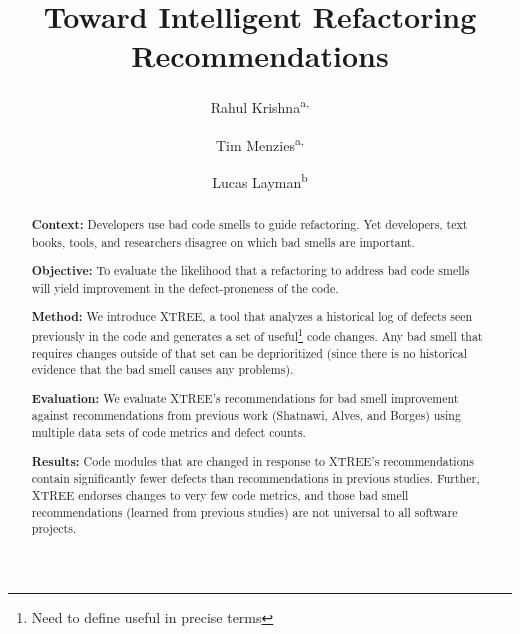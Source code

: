 \documentclass[twocolumn,5p]{elsarticle}
\theoremstyle{break}
\begin{document}
	
	\begin{frontmatter}
		
		\title{Toward Intelligent Refactoring Recommendations}
		
		\author{Rahul Krishna\textsuperscript{a,}}
		\author{Tim Menzies\textsuperscript{a,}}
		\author{Lucas Layman\textsuperscript{b}}
		\address{\textsuperscript{a}Department of Computer Science, North Carolina State University, Raleigh, NC, USA\\
			\textsuperscript{b}Fraunhofer CESE, College Park, USA}
		
		\begin{abstract} 
			{\bf Context: } 
			Developers use bad code smells to guide refactoring.
			Yet developers, text books, tools, and researchers disagree on which bad smells are important.
			
			\noindent 
			{\bf Objective:} To evaluate the likelihood that a refactoring to address bad code smells will yield improvement in the defect-proneness of the code.
			
			\noindent
			{\bf Method: } We introduce XTREE, a tool that analyzes a historical log of defects seen previously in the code and generates a set of useful\footnote{Need to define useful in precise terms} code changes.
			Any bad smell that requires changes outside of that set can be deprioritized (since there is no historical evidence that the bad smell causes any problems).
			
			\noindent
			{\bf Evaluation: } We evaluate XTREE's recommendations for bad smell improvement against recommendations from previous work (Shatnawi, Alves, and Borges) using multiple data sets of code metrics and defect counts.  
			
			\noindent
			{\bf Results: }Code modules that are changed in response to XTREE's recommendations contain significantly fewer defects than recommendations in previous studies. Further, XTREE endorses changes to very few code metrics, and those bad smell recommendations (learned from previous studies) are not universal to all  software projects.
			

\end{abstract}
\end{frontmatter}
\end{document}

